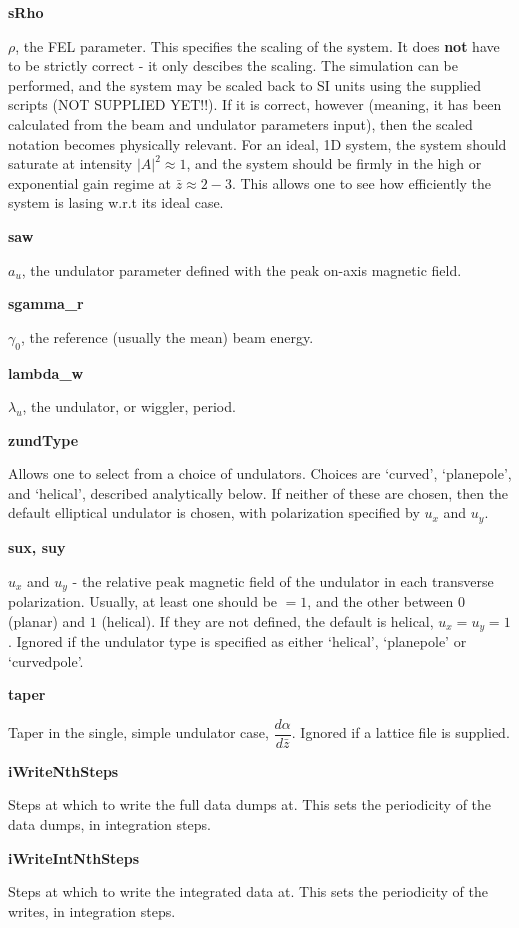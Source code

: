 \documentclass[12pt]{article}%
\begin{document}
{\bf sRho}

$\rho$, the FEL parameter. This specifies the scaling of the system. It does {\bf not} have to be strictly correct - it only descibes the scaling. The simulation can be performed, and the system may be scaled back to SI units using the supplied scripts (NOT SUPPLIED YET!!). If it is correct, however (meaning, it has been calculated from the beam and undulator parameters input), then the scaled notation becomes physically relevant. For an ideal, 1D system, the system should saturate at intensity $|A|^2 \approx 1$, and the system should be firmly in the high or exponential gain regime at $\bar{z} \approx 2-3$. This allows one to see how efficiently the system is lasing w.r.t its ideal case.


{\bf saw}

$a_u$, the undulator parameter defined with the peak on-axis magnetic field.

{\bf sgamma\_r}

$\gamma_0$, the reference (usually the mean) beam energy.

{\bf lambda\_w}

$\lambda_u$, the undulator, or wiggler, period.

{\bf zundType}

Allows one to select from a choice of undulators. Choices are `curved', `planepole', and `helical', described analytically below. If neither of these are chosen, then the default elliptical undulator is chosen, with polarization specified by $u_x$ and $u_y$.

{\bf sux, suy}

$u_x$ and $u_y$ - the relative peak magnetic field of the undulator in each transverse polarization. Usually, at least one should be $=1$, and the other between $0$ (planar) and $1$ (helical). If they are not defined, the default is helical, $u_x=u_y=1$. Ignored if the undulator type is specified as either `helical', `planepole' or `curvedpole'.

{\bf taper}

Taper in the single, simple undulator case, $\dfrac{d\alpha}{d \bar{z}}$. Ignored if a lattice file is supplied.

{\bf iWriteNthSteps}

Steps at which to write the full data dumps at. This sets the periodicity of the data dumps, in integration steps.

{\bf iWriteIntNthSteps}

Steps at which to write the integrated data at. This sets the periodicity of the writes, in integration steps.
\end{document}
